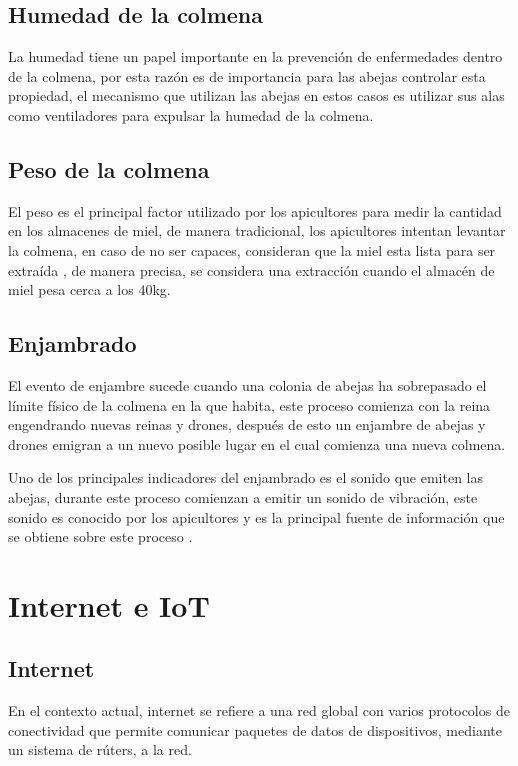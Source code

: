\subsection{Humedad de la colmena}
La humedad tiene un papel importante en la prevención de enfermedades dentro de la colmena, por esta razón es de importancia para las abejas controlar esta propiedad, el mecanismo que utilizan las abejas en estos casos es utilizar sus alas como ventiladores para expulsar la humedad de la colmena. \cite{chadwick_alton_tennant_fitzmaurice_earl_2016}

\subsection{Peso de la colmena}
El peso es el principal factor utilizado por los apicultores para medir la cantidad en los almacenes de miel, de manera tradicional, los apicultores intentan levantar la colmena, en caso de no ser capaces, consideran que la miel esta lista para ser extraída \cite{chadwick_alton_tennant_fitzmaurice_earl_2016}, de manera precisa, se considera una extracción cuando el almacén de miel pesa cerca a los 40kg.\cite{david_cramp}

\subsection{Enjambrado}
El evento de enjambre sucede cuando una colonia de abejas ha sobrepasado el límite físico de la colmena en la que habita, este proceso comienza con la reina engendrando nuevas reinas y drones, después de esto un enjambre de abejas y drones emigran a un nuevo posible lugar en el cual comienza una nueva colmena. \cite{chadwick_alton_tennant_fitzmaurice_earl_2016}

Uno de los principales indicadores del enjambrado es el sonido que emiten las abejas, durante este proceso comienzan a emitir un sonido de vibración, este sonido es conocido por los apicultores y es la principal fuente de información que se obtiene sobre este proceso \cite{david_cramp} \cite{chadwick_alton_tennant_fitzmaurice_earl_2016}.

\section{Internet e IoT}

\subsection{Internet}
En el contexto actual, internet se refiere a una red global con varios protocolos de conectividad que permite comunicar paquetes de datos de dispositivos, mediante un sistema de rúters, a la red. \cite{kamal_2017}

